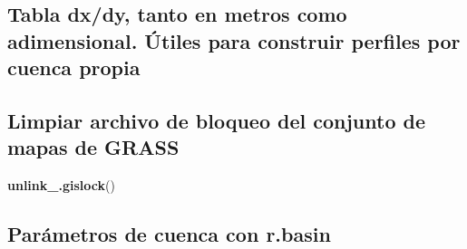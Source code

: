 \documentclass[11pt,]{article}
\newenvironment{Shaded}{\begin{snugshade}}{\end{snugshade}}
\newcommand{\KeywordTok}[1]{\textcolor[rgb]{0.13,0.29,0.53}{\textbf{#1}}}
\newcommand{\DecValTok}[1]{\textcolor[rgb]{0.00,0.00,0.81}{#1}}
\newcommand{\StringTok}[1]{\textcolor[rgb]{0.31,0.60,0.02}{#1}}
\newcommand{\OperatorTok}[1]{\textcolor[rgb]{0.81,0.36,0.00}{\textbf{#1}}}
\newcommand{\NormalTok}[1]{#1}
\begin{document}
\begin{Shaded}
\end{Shaded}

\subsection{Tabla dx/dy, tanto en metros como adimensional. Útiles para
construir perfiles por cuenca
propia}\label{tabla-dxdy-tanto-en-metros-como-adimensional.-uxfatiles-para-construir-perfiles-por-cuenca-propia}

\begin{Shaded}
\end{Shaded}

\subsection{Limpiar archivo de bloqueo del conjunto de mapas de
GRASS}\label{limpiar-archivo-de-bloqueo-del-conjunto-de-mapas-de-grass-2}

\begin{Shaded}
\begin{Highlighting}[]
\KeywordTok{unlink_.gislock}\NormalTok{()}
\end{Highlighting}
\end{Shaded}

\subsection{Parámetros de cuenca con
r.basin}\label{paruxe1metros-de-cuenca-con-r.basin}
\end{document}

